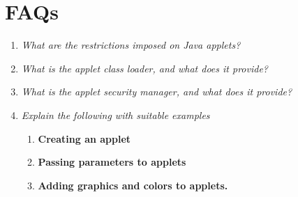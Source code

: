 \documentclass[11pt]{article}
\begin{document}
\section{FAQs}
\begin{enumerate}
	\item \textit{What are the restrictions imposed on Java applets?}

	\item \textit{What is the applet class loader, and what does it provide?}

	\item \textit{What is the applet security manager, and what does it provide?}

	\item \textit{Explain the following with suitable examples}

	      \begin{enumerate}
		      \item \textbf{Creating an applet}
		      \item \textbf{Passing parameters to applets}
		      \item \textbf{Adding graphics and colors to applets.}
	      \end{enumerate}
\end{enumerate}
\end{document}

